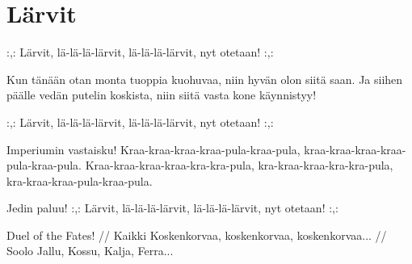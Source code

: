 \section{Lärvit}

:,: Lärvit, lä-lä-lä-lärvit, 
lä-lä-lä-lärvit, nyt otetaan! :,: 
 
Kun tänään otan monta tuoppia kuohuvaa, 
niin hyvän olon siitä saan. 
Ja siihen päälle vedän putelin koskista, 
niin siitä vasta kone käynnistyy! 
 
:,: Lärvit, lä-lä-lä-lärvit, 
lä-lä-lä-lärvit, nyt otetaan! :,: 
 
Imperiumin vastaisku! 
Kraa-kraa-kraa-kraa-pula-kraa-pula, 
kraa-kraa-kraa-kraa-pula-kraa-pula. 
Kraa-kraa-kraa-kraa-kra-kra-pula, 
kra-kraa-kraa-kra-kra-pula, 
kra-kraa-kraa-pula-kraa-pula. 
 
Jedin paluu! 
:,: Lärvit, lä-lä-lä-lärvit, 
lä-lä-lä-lärvit, nyt otetaan! :,: 
 
Duel of the Fates! 
// Kaikki 
Koskenkorvaa, koskenkorvaa, koskenkorvaa... 
// Soolo 
Jallu, Kossu, Kalja, Ferra...